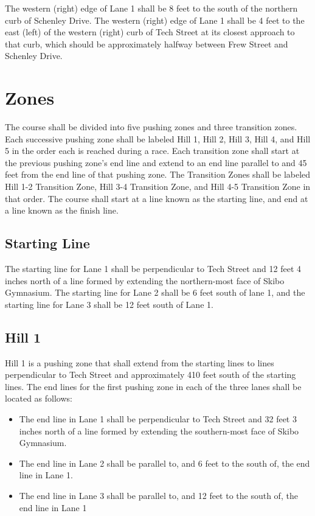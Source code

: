	The western (right) edge of Lane 1 shall be 8 feet to the south of the northern curb of Schenley Drive. The western (right) edge of Lane 1 shall be 4 feet to the east (left) of the western (right) curb of Tech Street at its closest approach to that curb, which should be approximately halfway between Frew Street and Schenley Drive.

\section{Zones}

	The course shall be divided into five pushing zones and three transition zones. Each successive pushing zone shall be labeled Hill 1, Hill 2, Hill 3, Hill 4, and Hill 5 in the order each is reached during a race. Each transition zone shall start at the previous pushing zone's end line and extend to an end line parallel to and 45 feet from the end line of that pushing zone. The Transition Zones shall be labeled Hill 1-2 Transition Zone, Hill 3-4 Transition Zone, and Hill 4-5 Transition Zone in that order. The course shall start at a line known as the starting line, and end at a line known as the finish line.

\subsection{Starting Line}

	The starting line for Lane 1 shall be perpendicular to Tech Street and 12 feet 4 inches north of a line formed by extending the northern-most face of Skibo Gymnasium. The starting line for Lane 2 shall be 6 feet south of lane 1, and the starting line for Lane 3 shall be 12 feet south of Lane 1.

\subsection{Hill 1}

	Hill 1 is a pushing zone that shall extend from the starting lines to lines perpendicular to Tech Street and approximately 410 feet south of the starting lines. The end lines for the first pushing zone in each of the three lanes shall be located as follows:

	\begin{itemize}
	
		\item
		The end line in Lane 1 shall be perpendicular to Tech Street and 32 feet 3 inches north of a line formed by extending the southern-most face of Skibo Gymnasium.

		\item
		The end line in Lane 2 shall be parallel to, and 6 feet to the south of, the end line in Lane 1.
		
		\item
		The end line in Lane 3 shall be parallel to, and 12 feet to the south of, the end line in Lane 1

	\end{itemize}

